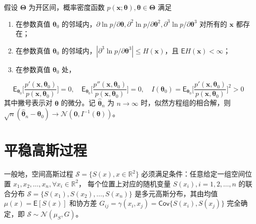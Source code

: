 \documentclass[12pt,a4paper,UTF8,twoside]{book}
\providecommand{\tightlist}{%
  \setlength{\itemsep}{0pt}\setlength{\parskip}{0pt}}
\theoremstyle{definition}
\theoremstyle{definition}
\theoremstyle{definition}
\theoremstyle{remark}
\let\BeginKnitrBlock\begin \let\EndKnitrBlock\end
\begin{document}
\BeginKnitrBlock{theorem}[渐近正态性]
\protect\hypertarget{thm:asymptotic-normality}{}{\label{thm:asymptotic-normality}
{} }假设 \(\boldsymbol{\Theta}\)
为开区间，概率密度函数
\(p(\mathbf{x};\boldsymbol{\theta}), \boldsymbol{\theta} \in \boldsymbol{\Theta}\)
满足

\begin{enumerate}
\def\labelenumi{\arabic{enumi}.}
\tightlist
\item
  在参数真值 \(\boldsymbol{\theta}_{0}\)
  的邻域内，\(\partial \ln p/\partial \boldsymbol{\theta}, \partial^2 \ln p/\partial \boldsymbol{\theta}^2, \partial^3 \ln p/\partial \boldsymbol{\theta}^3\)
  对所有的 \(\mathbf{x}\) 都存在；
\item
  在参数真值 \(\boldsymbol{\theta}_{0}\)
  的邻域内，\(| \partial^3 \ln p/\partial \boldsymbol{\theta}^3 | \leq H(\mathbf{x})\)，且
  \(\mathsf{E}H(\mathbf{x}) < \infty\)；
\item
  在参数真值 \(\boldsymbol{\theta}_{0}\) 处，
\end{enumerate}

\[\mathsf{E}_{\boldsymbol{\theta}_{0}} \big[ \frac{ p'(\mathbf{x},\boldsymbol{\theta}_{0}) }{ p(\mathbf{x},\boldsymbol{\theta}_{0}) } \big] = 0, \quad
\mathsf{E}_{\boldsymbol{\theta}_{0}} \big[ \frac{ p''(\mathbf{x},\boldsymbol{\theta}_{0}) }{ p(\mathbf{x},\boldsymbol{\theta}_{0}) } \big] = 0, \quad
I(\boldsymbol{\theta}_{0}) = \mathsf{E}_{\boldsymbol{\theta}_{0}} \big[ \frac{ p'(\mathbf{x},\boldsymbol{\theta}_{0}) }{ p(\mathbf{x},\boldsymbol{\theta}_{0}) } \big]^{2} > 0\]
\noindent 其中撇号表示对 \(\boldsymbol{\theta}\) 的微分。记
\(\hat{\boldsymbol{\theta}}_{n}\) 为 \(n \to \infty\)
时，似然方程组的相合解，则\(\sqrt{n}(\hat{\boldsymbol{\theta}}_{n} - \boldsymbol{\theta}_{0}) \longrightarrow \mathcal{N}(\mathbf{0},I^{-1}(\boldsymbol{\theta}))\)。
\EndKnitrBlock{theorem}

\hypertarget{sec:stationary-gaussian-process}{%
\section{平稳高斯过程}\label{sec:stationary-gaussian-process}}

一般地，空间高斯过程 \(\mathcal{S} = \{S(x),x\in\mathbb{R}^2\}\)
必须满足条件：任意给定一组空间位置
\(x_1,x_2,\ldots,x_n, \forall x_{i} \in \mathbb{R}^2\)，
每个位置上对应的随机变量 \(S(x_i), i = 1,2,\ldots,n\) 的联合分布
\(\mathcal{S} = \{S(x_1), S(x_2),\ldots,S(x_n)\}\)
是多元高斯分布，其由均值 \(\mu(x) = \mathsf{E}[S(x)]\) 和协方差
\(G_{ij} = \gamma(x_i,x_j) = \mathsf{Cov}\{S(x_i),S(x_j)\}\)
完全确定，即 \(\mathcal{S} \sim \mathcal{N}(\mu_{S},G)\)。
\end{document}
